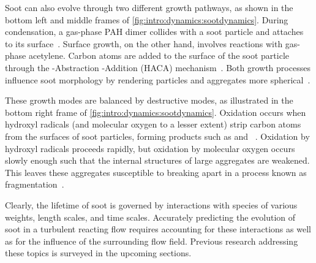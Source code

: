 Soot can also evolve through two different growth pathways, as shown in the bottom left and middle frames of \cref{fig:intro:dynamics:sootdynamics}. During condensation, a gas-phase PAH dimer collides with a soot particle and attaches to its surface~\cite{hmom2009,blanquart2009}. Surface growth, on the other hand, involves reactions with gas-phase acetylene. Carbon atoms are added to the surface of the soot particle through the -Abstraction -Addition (HACA) mechanism~\cite{frenklach1985,frenklach1991}. Both growth processes influence soot morphology by rendering particles and aggregates more spherical~\cite{mitchell1998,mitchell2003,park2003}.

These growth modes are balanced by destructive modes, as illustrated in the bottom right frame of \cref{fig:intro:dynamics:sootdynamics}. Oxidation occurs when hydroxyl radicals (and molecular oxygen to a lesser extent) strip carbon atoms from the surfaces of soot particles, forming products such as  and ~\cite{kazakov1995,neoh1981,stanmore2001}. Oxidation by hydroxyl radicals proceeds rapidly, but oxidation by molecular oxygen occurs slowly enough such that the internal structures of large aggregates are weakened. This leaves these aggregates susceptible to breaking apart in a process known as fragmentation~\cite{mueller2011,neoh1985}.

Clearly, the lifetime of soot is governed by interactions with species of various weights, length scales, and time scales. Accurately predicting the evolution of soot in a turbulent reacting flow requires accounting for these interactions as well as for the influence of the surrounding flow field. Previous research addressing these topics is surveyed in the upcoming sections.
